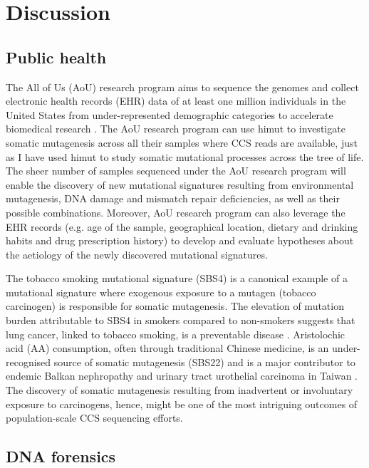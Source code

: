 \section{Discussion}

\subsection{Public health}

The All of Us (AoU) research program aims to sequence the genomes and collect electronic health records (EHR) data of at least one million individuals in the United States from under-represented demographic categories to accelerate biomedical research \cite{AoU2019}. The AoU research program can use himut to investigate somatic mutagenesis across all their samples where CCS reads are available, just as I have used himut to study somatic mutational processes across the tree of life. The sheer number of samples sequenced under the AoU research program will enable the discovery of new mutational signatures resulting from environmental mutagenesis, DNA damage and mismatch repair deficiencies, as well as their possible combinations. Moreover, AoU research program can also leverage the EHR records (e.g. age of the sample, geographical location, dietary and drinking habits and drug prescription history) to develop and evaluate hypotheses about the aetiology of the newly discovered mutational signatures.

The tobacco smoking mutational signature (SBS4) is a canonical example of a mutational signature where exogenous exposure to a mutagen (tobacco carcinogen) is responsible for somatic mutagenesis. The elevation of mutation burden attributable to SBS4 in smokers compared to non-smokers suggests that lung cancer, linked to tobacco smoking, is a preventable disease \cite{Alexandrov2016-uw}. Aristolochic acid (AA) consumption, often through traditional Chinese medicine, is an under-recognised source of somatic mutagenesis (SBS22) and is a major contributor to endemic Balkan nephropathy \cite{Grollman2007-rh} and urinary tract urothelial carcinoma in Taiwan \cite{Chen2012-vh}. The discovery of somatic mutagenesis resulting from inadvertent or involuntary exposure to carcinogens, hence, might be one of the most intriguing outcomes of population-scale CCS sequencing efforts. 

\subsection{DNA forensics}

